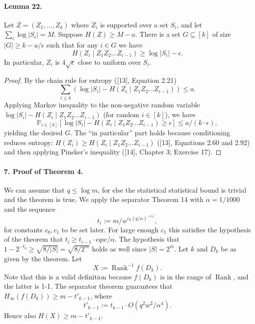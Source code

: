 \documentclass[10pt,a4paper]{article}
\begin{document}
\paragraph{Lemma 22.}
Let $Z=(Z_1,\ldots,Z_k)$ where $Z_i$ is supported over a set $S_i$, and let $\sum_i\log|S_i|=M$. Suppose $H(Z)\geq M-a$. There is a set $G\subseteq[k]$ of size $|G|\geq k-a/\epsilon$ such that for any $i\in G$ we have
\[H(Z_i\mid Z_1Z_2\ldots Z_{i-1})\geq\log|S_i|-\epsilon.\]
In particular, $Z_i$ is $4\sqrt\epsilon$ close to uniform over $S_i$.
\begin{proof}
By the chain rule for entropy ([13], Equation 2.21)
\[\sum_{i\leq k}(\log|S_i|-H(Z_i\mid Z_1Z_2\ldots Z_{i-1}))\leq a.\]
Applying Markov inequality to the non-negative random variable $\log|S_i|-H(Z_i\mid Z_1Z_2\ldots Z_{i-1})$ (for random $i\in[k]$), we have
\[\mathbb P_{i\in[k]}[\log|S_i|-H(Z_i\mid Z_1Z_2\ldots Z_{i-1})\geq\epsilon]\leq a/(k\cdot\epsilon),\]
yielding the desired $G$.
The ``in particular'' part holds because conditioning reduces entropy: $H(Z_i)\geq H(Z_i\mid Z_1Z_2\ldots Z_{i-1})$ ([13], Equations 2.60 and 2.92) and then applying Pinsker's inequality ([14], Chapter 3; Exercise 17).
\end{proof}

\paragraph{7. Proof of Theorem 4.}
We can assume that $q\leq\log m$, for else the statistical statistical bound is trivial and the theorem is true. We apply the separator Theorem 14 with $\alpha=1/1000$ and the sequence
\[t_i:=m/w^{c_0(q/\alpha)^{-c_1i}},\]
for constants $c_0,c_1$ to be set later. For large enough $c_1$ this satisfies the hypothesis of the theorem that $t_i\geq t_{i-1}\cdot cqw/\alpha$. The hypothesis that $1-2^{-t_0}\geq\sqrt{8/|S|}=\sqrt{8/2^m}$ holds as well since $|S|=2^m$.
Let $k$ and $D_k$ be as given by the theorem. Let
\[X:=\operatorname{Rank}^{-1}f(D_k).\]
Note that this is a valid definition because $f(D_k)$ is in the range of $\operatorname{Rank}$, and the latter is 1-1. The separator theorem guarantees that $H_\infty(f(D_k))\geq m-t'_{k-1}$, where
\[t'_{k-1}:=t_{k-1}\cdot O(q^2w^2/\alpha^4).\]
Hence also $H(X)\geq m-t'_{k-1}$.
\end{document}

